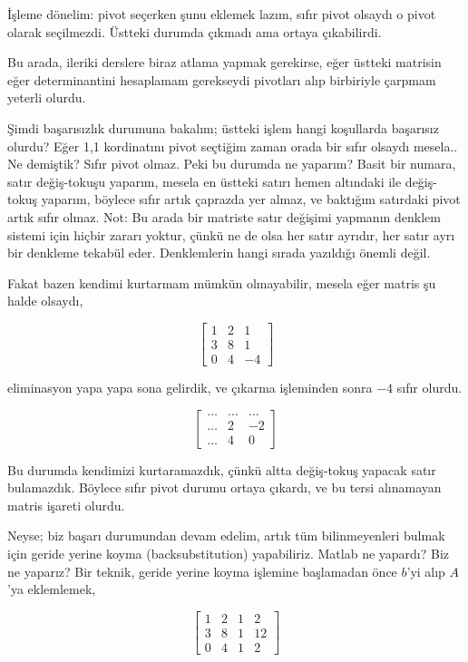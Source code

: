 \documentclass[12pt,fleqn]{article}\usepackage{../../common}
\begin{document}
İşleme dönelim: pivot seçerken şunu eklemek lazım, sıfır pivot olsaydı o
pivot olarak seçilmezdi. Üstteki durumda çıkmadı ama ortaya çıkabilirdi. 

Bu arada, ileriki derslere biraz atlama yapmak gerekirse, eğer üstteki
matrisin eğer determinantini hesaplamam gerekseydi pivotları alıp
birbiriyle çarpmam yeterli olurdu. 

Şimdi başarısızlık durumuna bakalım; üstteki işlem hangi koşullarda
başarısız olurdu? Eğer 1,1 kordinatını pivot seçtiğim zaman orada bir sıfır
olsaydı mesela.. Ne demiştik? Sıfır pivot olmaz. Peki bu durumda ne
yaparım? Basit bir numara, satır değiş-tokuşu yaparım, mesela en üstteki
satırı hemen altındaki ile değiş-tokuş yaparım, böylece sıfır artık
çaprazda yer almaz, ve baktığım satırdaki pivot artık sıfır olmaz. Not: Bu
arada bir matriste satır değişimi yapmanın denklem sistemi için hiçbir
zararı yoktur, çünkü ne de olsa her satır ayrıdır, her satır ayrı bir
denkleme tekabül eder. Denklemlerin hangi sırada yazıldığı önemli değil.

Fakat bazen kendimi kurtarmam mümkün olmayabilir, mesela eğer matris şu
halde olsaydı, 

$$ 
\left[\begin{array}{rrr}
1 & 2 & 1 \\
3 & 8 & 1 \\
0 & 4 & -4
\end{array}\right]
 $$

eliminasyon yapa yapa sona gelirdik, ve çıkarma işleminden sonra $-4$
sıfır olurdu. 

$$ 
\left[\begin{array}{rrr}
    \dots & \dots & \dots \\
    \dots &  2 & -2 \\
    \dots & 4 &  0
  \end{array}\right]
$$

Bu durumda kendimizi kurtaramazdık, çünkü altta değiş-tokuş yapacak satır
bulamazdık. Böylece sıfır pivot durumu ortaya çıkardı, ve bu tersi
alınamayan matris işareti olurdu.

Neyse; biz başarı durumundan devam edelim, artık tüm bilinmeyenleri bulmak
için geride yerine koyma (backsubstitution) yapabiliriz. Matlab ne yapardı?
Biz ne yaparız? Bir teknik, geride yerine koyma işlemine başlamadan önce
$b$'yi alıp $A$'ya eklemlemek,

$$ 
\left[\begin{array}{rrrr}
1 & 2 & 1 & 2\\
3 & 8 & 1 & 12 \\
0 & 4 & 1 & 2
\end{array}\right]
 $$
\end{document}
